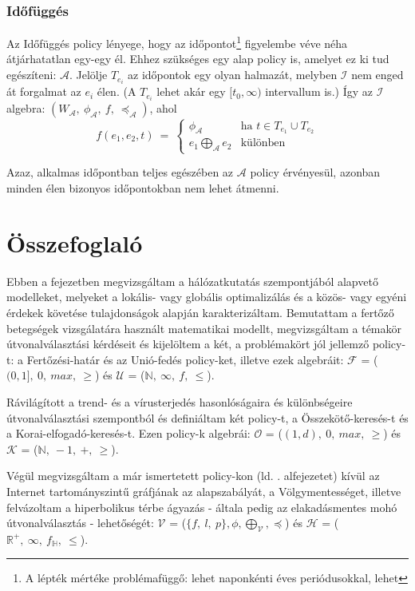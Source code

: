       \subsubsection{Időfüggés}
      Az Időfüggés policy lényege, hogy az időpontot\footnote{A lépték mértéke problémafüggő: lehet naponkénti éves periódusokkal, lehet } figyelembe véve néha átjárhatatlan egy-egy él. Ehhez szükséges egy alap policy is, amelyet ez ki tud egészíteni: $\mathcal{A}$. Jelölje $T_{e_i}$ az időpontok egy olyan halmazát, melyben $\mathcal{I}$ nem enged át forgalmat az $e_i$ élen. (A $T_{e_i}$ lehet akár egy $[t_0, \infty)$ intervallum is.) Így az $\mathcal{I}$ algebra: $(W_{\mathcal{A}},~\phi_{\mathcal{A}},~f,~\preceq_{\mathcal{A}})$, ahol
      $$f(e_1,e_2,t)~=~
      \begin{cases}
        \phi_{\mathcal{A}} & \text{ha } t \in T_{e_1} \cup T_{e_2}\\
        e_1 \bigoplus_{\mathcal{A}} e_2 & \text{különben}
      \end{cases}$$

      Azaz, alkalmas időpontban teljes egészében az $\mathcal{A}$ policy érvényesül, azonban minden élen bizonyos időpontokban nem lehet átmenni.\\

  \section{Összefoglaló}

  Ebben a fejezetben megvizsgáltam a hálózatkutatás szempontjából alapvető modelleket, melyeket a lokális- vagy globális optimalizálás és a közös- vagy egyéni érdekek követése tulajdonságok alapján karakterizáltam. Bemutattam a fertőző betegségek vizsgálatára használt matematikai modellt, megvizsgáltam a témakör útvonalválasztási kérdéseit és kijelöltem a két, a problémakört jól jellemző policy-t: a Fertőzési-határ és az Unió-fedés policy-ket, illetve ezek algebráit: $\mathcal{F}$ = ($(0,1],~0,~max,~\geq$) és $\mathcal{U}$ = ($\mathbb{N},~\infty,~f,~\leq$).

  Rávilágított a trend- és a vírusterjedés hasonlóságaira és különbségeire útvonalválasztási szempontból és definiáltam két policy-t, a Összekötő-keresés-t és a Korai-elfogadó-keresés-t. Ezen policy-k algebrái: $\mathcal{O}$ = ($(1,d),~0,~max,~\geq$) és $\mathcal{K}$ = ($\mathbb{N},~-1,~+,~\geq$).

  Végül megvizsgáltam a már ismertetett policy-kon (ld. . alfejezetet) kívül az Internet tartományszintű gráfjának az alapszabályát, a Völgymentességet, illetve felvázoltam a hiperbolikus térbe ágyazás - általa pedig az elakadásmentes mohó útvonalválasztás - lehetőségét: $\mathcal{V}$ = ($\{f,~l,~p\},\phi,\bigoplus_{\mathcal{V}},\preceq$) és $\mathcal{H}$ = ($\mathbb{R}^{+},~\infty,~f_{\mathbb{H}},~\leq$).
